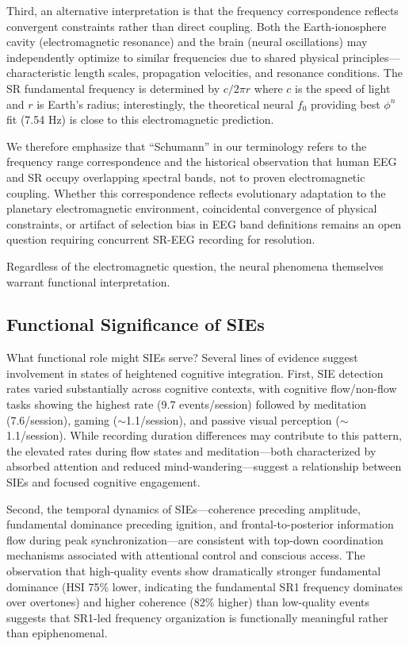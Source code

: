 \documentclass[11pt,a4paper]{article}
\begin{document}
Third, an alternative interpretation is that the frequency correspondence reflects convergent constraints rather than direct coupling. Both the Earth-ionosphere cavity (electromagnetic resonance) and the brain (neural oscillations) may independently optimize to similar frequencies due to shared physical principles—characteristic length scales, propagation velocities, and resonance conditions. The SR fundamental frequency is determined by $c/2\pi r$ where $c$ is the speed of light and $r$ is Earth's radius; interestingly, the theoretical neural $f_0$ providing best $\phi^n$ fit (7.54 Hz) is close to this electromagnetic prediction.

We therefore emphasize that ``Schumann'' in our terminology refers to the frequency range correspondence and the historical observation that human EEG and SR occupy overlapping spectral bands, not to proven electromagnetic coupling. Whether this correspondence reflects evolutionary adaptation to the planetary electromagnetic environment, coincidental convergence of physical constraints, or artifact of selection bias in EEG band definitions remains an open question requiring concurrent SR-EEG recording for resolution.

Regardless of the electromagnetic question, the neural phenomena themselves warrant functional interpretation.

\subsection{Functional Significance of SIEs}

What functional role might SIEs serve? Several lines of evidence suggest involvement in states of heightened cognitive integration. First, SIE detection rates varied substantially across cognitive contexts, with cognitive flow/non-flow tasks showing the highest rate (9.7 events/session) followed by meditation (7.6/session), gaming ($\sim$1.1/session), and passive visual perception ($\sim$1.1/session). While recording duration differences may contribute to this pattern, the elevated rates during flow states and meditation—both characterized by absorbed attention and reduced mind-wandering—suggest a relationship between SIEs and focused cognitive engagement.

Second, the temporal dynamics of SIEs—coherence preceding amplitude, fundamental dominance preceding ignition, and frontal-to-posterior information flow during peak synchronization—are consistent with top-down coordination mechanisms associated with attentional control and conscious access. The observation that high-quality events show dramatically stronger fundamental dominance (HSI 75\% lower, indicating the fundamental SR1 frequency dominates over overtones) and higher coherence (82\% higher) than low-quality events suggests that SR1-led frequency organization is functionally meaningful rather than epiphenomenal.
\end{document}
